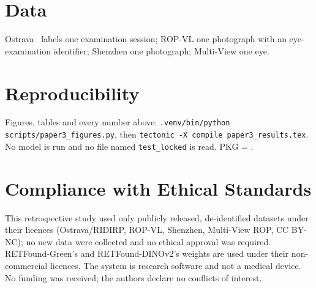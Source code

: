 \documentclass[conference]{IEEEtran}
\begin{document}
\clearpage
\section{Data}
Ostrava~\cite{timkovic2024} labels one examination session; ROP-VL one photograph with an eye-examination identifier; Shenzhen one photograph; Multi-View one eye.

\begin{table}[!t]
\caption{Data by hospital and class. CV pool: every photograph lies in exactly one validation fold. Training-eligible: after per-infant caps (training sides only); the v4 pool adds a per-device Ostrava quality filter. $^\ast$Locked-half labels were not read; counts from the protocol.}
\label{tab:pool}
\centering\scriptsize\setlength{\tabcolsep}{4pt}

\end{table}

\begin{table}[!t]
\caption{LOSO fold compositions: held-out source (test photographs after duplicate exclusion, infants) and training photographs by class in the v3 pool (A, B, D) and the v4 pool (H, I).}
\label{tab:losofolds}
\centering\scriptsize\setlength{\tabcolsep}{4pt}

\end{table}

\section{Reproducibility}
Figures, tables and every number above: \texttt{.venv/bin/python scripts/paper3\_figures.py}, then \texttt{tectonic -X compile paper3\_results.tex}. No model is run and no file named \texttt{test\_locked} is read. PKG = .

\begin{table}[!t]
\caption{Sources: path and last commit touching it (\texttt{git log}); ``git-ignored, on disk'' files exist only in the working tree (the CSVs fall under the repository's \texttt{*.csv} rule).}
\label{tab:repro}
\centering\scriptsize\setlength{\tabcolsep}{4pt}

\end{table}

\section*{Compliance with Ethical Standards}
This retrospective study used only publicly released, de-identified datasets under their licences (Ostrava/RIDIRP, ROP-VL, Shenzhen, Multi-View ROP, CC BY-NC); no new data were collected and no ethical approval was required. RETFound-Green's and RETFound-DINOv2's weights are used under their non-commercial licences. The system is research software and not a medical device. No funding was received; the authors declare no conflicts of interest.
\end{document}
